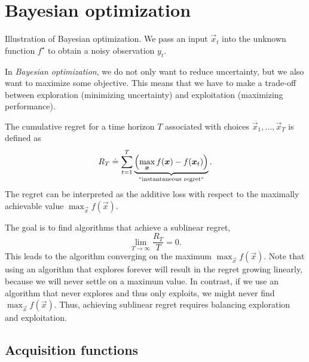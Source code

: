 \section{Bayesian optimization} \label{sec:bo}

\begin{marginfigure}
    \centering
    \caption{Illustration of Bayesian optimization. We pass an input $\vec{x}_t$
        into the unknown function $f^\star$ to obtain a noisy observation $y_t$.}
    \label{fig:bo}
\end{marginfigure}

In \textit{Bayesian optimization}, we do not only want to reduce uncertainty,
but we also want to maximize some objective. This means that we have to make a trade-off between
exploration (minimizing uncertainty) and exploitation (maximizing performance).

\begin{definition}[Regret]
    The cumulative regret for a time horizon $T$ associated with choices
    $\vec{x}_1,\ldots,\vec{x}_T$ is defined as \[
        R_T \doteq \sum_{t=1}^T \underbrace{\lft(\max_{\vec{x}} f(\vec{x}) - f(\vec{x}_t)\rgt)}_{\text{``instantaneous regret``}}.
    \]
    The regret can be interpreted as the additive loss with respect to the
    maximally achievable value $\max_{\vec{x}} f(\vec{x})$.
\end{definition}

The goal is to find algorithms that achieve a sublinear regret, \[
    \lim_{T\to\infty} \frac{R_T}{T} = 0.
\]
This leads to the algorithm converging on the maximum $\max_{\vec{x}}
    f(\vec{x})$. Note that using an algorithm that explores forever will result in
the regret growing linearly, because we will never settle on a maximum value.
In contrast, if we use an algorithm that never explores and thus only
exploits, we might never find $\max_{\vec{x}} f(\vec{x})$. Thus, achieving
sublinear regret requires balancing exploration and exploitation.

\subsection{Acquisition functions}

